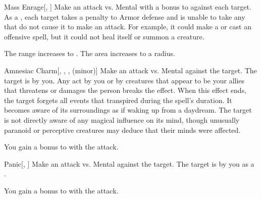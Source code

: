 \lowercase{\hypertarget{spell:Mass Enrage}{}}\label{spell:Mass Enrage}
\begin{freeability}[Rank 4]{\hypertarget{spell:Mass Enrage}{Mass Enrage}}[, ]
Make an attack vs. Mental with a  bonus to  against each target.
\hit As a , each target takes a  penalty to Armor defense and is unable to take any  that do not cause it to make an attack.
For example, it could make a  or cast an offensive spell, but it could not heal itself or summon a creature.

\rankline
{} The range increases to \rnglong.
 The area increases to a \arealarge radius.
\end{freeability}
\vspace{0.25em}



\lowercase{\hypertarget{spell:Amnesiac Charm}{}}\label{spell:Amnesiac Charm}
\begin{freeability}[Rank 6]{\hypertarget{spell:Amnesiac Charm}{Amnesiac Charm}}[, , ,  (minor)]
Make an attack vs. Mental against the target.
\hit The target is \charmed by you.
Any act by you or by creatures that appear to be your allies that threatens or damages the  person breaks the effect.
When this effect ends, the target forgets all events that transpired during the spell's duration.
It becomes aware of its surroundings as if waking up from a daydream.
The target is not directly aware of any magical influence on its mind, though unusually paranoid or perceptive creatures may deduce that their minds were affected.

\rankline
{} You gain a  bonus to  with the attack.
\end{freeability}
\vspace{0.25em}



\lowercase{\hypertarget{spell:Panic}{}}\label{spell:Panic}
\begin{freeability}[Rank 6]{\hypertarget{spell:Panic}{Panic}}[, ]
Make an attack vs. Mental against the target.
\hit The target is \panicked by you as a .

\rankline
{} You gain a  bonus to  with the attack.
\end{freeability}
\vspace{0.25em}



